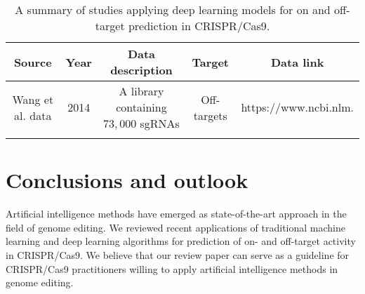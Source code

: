 \documentclass[unnumsec,webpdf,contemporary,large]{oup-authoring-template}
\theoremstyle{thmstyleone}%
\theoremstyle{thmstyletwo}%
\theoremstyle{thmstylethree}%
\begin{document}
%

\begin{longtable}{ccccc}
\caption{A summary of studies applying deep learning models for on and off-target prediction in CRISPR/Cas9. \label{tab3}}\\
\midrule
Source & Year & Data description & Target & Data link \\
\midrule
Wang et al. data \cite{wang2014genetic} & 2014 & A library containing $73,000$ sgRNAs & Off-targets & https://www.ncbi.nlm. \\
\botrule
\end{longtable}





\section{Conclusions and outlook}
Artificial intelligence methods have emerged as state-of-the-art approach in the field of genome editing. We reviewed recent applications of traditional machine learning and deep learning algorithms for prediction of on- and off-target activity in CRISPR/Cas9. We believe that our review paper can serve as a guideline for CRISPR/Cas9 practitioners willing to apply artificial intelligence methods in genome editing.
\end{document}
